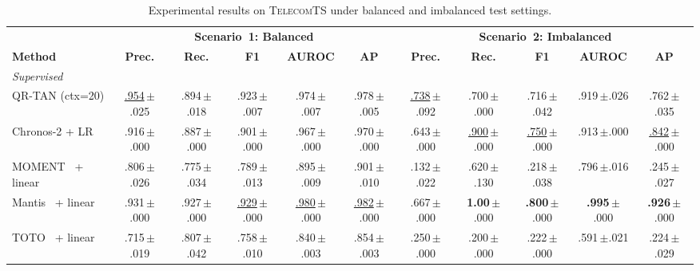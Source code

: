 \documentclass[conference]{IEEEtran}
\newcommand{\sd}[1]{\,{\fontsize{6pt}{7pt}\selectfont $\pm$#1}}
\begin{document}
\begin{table}[t]
  \caption{Experimental results on \textsc{TelecomTS} under balanced and imbalanced test settings.}
  \label{tab:telecomts_benchmark}
  \small
  \setlength{\tabcolsep}{2pt}
  \begin{tabular*}{\textwidth}{@{\extracolsep{\fill}}l|ccccc|ccccc@{}}
    \toprule
                                                 & \multicolumn{5}{c|}{\textbf{Scenario~1: Balanced}}
                                                 & \multicolumn{5}{c}{\textbf{Scenario~2: Imbalanced}} \\
    \cmidrule(lr){2-6} \cmidrule(lr){7-11}
    \textbf{Method}                              & \textbf{Prec.} & \textbf{Rec.} & \textbf{F1} & \textbf{AUROC} & \textbf{AP}
                                                 & \textbf{Prec.} & \textbf{Rec.} & \textbf{F1} & \textbf{AUROC} & \textbf{AP} \\
    \midrule
    \multicolumn{11}{l}{\emph{Supervised}} \\
    QR-TAN (ctx=20)                              & \underline{.954}\sd{.025} & .894\sd{.018} & .923\sd{.007} & .974\sd{.007} & .978\sd{.005}
                                                 & \underline{.738}\sd{.092} & .700\sd{.000} & .716\sd{.042} & .919\sd{.026} & .762\sd{.035} \\
    Chronos-2 + LR                               & .916\sd{.000} & .887\sd{.000} & .901\sd{.000} & .967\sd{.000} & .970\sd{.000}
                                                 & .643\sd{.000} & \underline{.900}\sd{.000} & \underline{.750}\sd{.000} & .913\sd{.000} & \underline{.842}\sd{.000} \\
    MOMENT~\cite{goswami2024moment} + linear     & .806\sd{.026} & .775\sd{.034} & .789\sd{.013} & .895\sd{.009} & .901\sd{.010}
                                                 & .132\sd{.022} & .620\sd{.130} & .218\sd{.038} & .796\sd{.016} & .245\sd{.027} \\
    Mantis~\cite{feofanov2025mantis} + linear    & .931\sd{.000} & .927\sd{.000} & \underline{.929}\sd{.000} & \underline{.980}\sd{.000} & \underline{.982}\sd{.000}
                                                 & .667\sd{.000} & \textbf{1.00}\sd{.000} & \textbf{.800}\sd{.000} & \textbf{.995}\sd{.000} & \textbf{.926}\sd{.000} \\
    TOTO~\cite{cohen2025toto} + linear           & .715\sd{.019} & .807\sd{.042} & .758\sd{.010} & .840\sd{.003} & .854\sd{.003}
                                                 & .250\sd{.000} & .200\sd{.000} & .222\sd{.000} & .591\sd{.021} & .224\sd{.029} \\

\end{tabular*}
\end{table}
\end{document}
